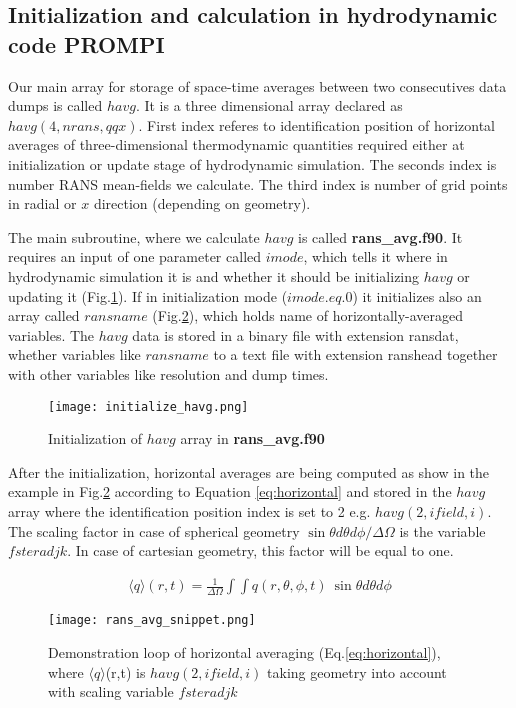\documentclass[11pt,paper=a4]{report}
\begin{document}
\subsection{Initialization and calculation in hydrodynamic code PROMPI}

Our main array for storage of space-time averages between two consecutives data dumps is called $havg$. It is a three dimensional array declared as $havg(4,nrans,qqx)$. First index referes to identification position of horizontal averages of three-dimensional thermodynamic quantities required either at initialization or update stage of hydrodynamic simulation. The seconds index is number RANS mean-fields we calculate. The third index is number of grid points in radial or $x$ direction (depending on geometry).

The main subroutine, where we calculate $havg$ is called {\bf rans\_avg.f90}. It requires an input of one parameter called $imode$, which tells it where in hydrodynamic simulation it is and whether it should be initializing $havg$ or updating it (Fig.\ref{havg:init}). If in initialization mode ($imode.eq.0$) it initializes also an array called $ransname$ (Fig.\ref{havg:calc}), which holds name of horizontally-averaged variables. The $havg$ data is stored in a binary file with extension ransdat, whether variables like $ransname$ to a text file with extension ranshead together with other variables like resolution and dump times. 

\begin{figure}[!h]
\centerline{
\texttt{[image: initialize\_havg.png]}}
\caption{Initialization of $havg$ array in {\bf rans\_avg.f90}}
\label{havg:init}
\end{figure}

After the initialization, horizontal averages are being computed as show in the example in Fig.\ref{havg:calc} according to Equation \ref{eq:horizontal}  and stored in the $havg$ array where the identification position index is set to 2 e.g. $havg(2,ifield,i)$. The scaling factor in case of spherical geometry $\sin \theta d \theta d \phi / \Delta \Omega$ is the variable $fsteradjk$. In case of cartesian geometry, this factor will be equal to one.  

\begin{align}
\label{eq:horizontal}
\langle q \rangle (r,t) = \frac{1}{\Delta \Omega} \int \int q(r,\theta,\phi,t)~\sin \theta d \theta d \phi
\end{align}

\begin{figure}[!h]
\centerline{
\texttt{[image: rans\_avg\_snippet.png]}}
\caption{Demonstration loop of horizontal averaging (Eq.\ref{eq:horizontal}), where $\langle q \rangle$(r,t) is $havg(2,ifield,i)$ taking geometry into account with scaling variable $fsteradjk$}
\label{havg:calc}
\end{figure}
\end{document}
